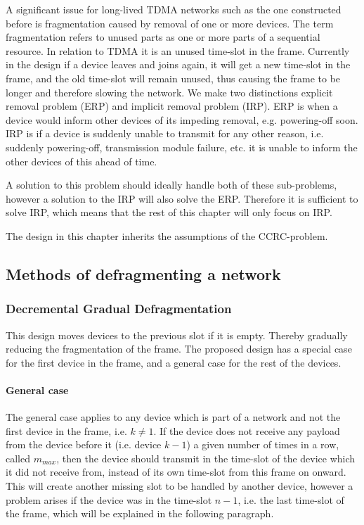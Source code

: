 A significant issue for long-lived TDMA networks such as the one constructed before is fragmentation caused by removal of one or more devices. 
The term fragmentation refers to unused parts as one or more parts of a sequential resource. 
In relation to TDMA it is an unused time-slot in the frame. 
Currently in the design if a device leaves and joins again, it will get a new time-slot in the frame, and the old time-slot will remain unused, thus causing the frame to be longer and therefore slowing the network.
We make two distinctions explicit removal problem (ERP) and implicit removal problem (IRP).
ERP is when a device would inform other devices of its impeding removal, e.g. powering-off soon. 
IRP is if a device is suddenly unable to transmit for any other reason, i.e. suddenly powering-off, transmission module failure, etc. it is unable to inform the other devices of this ahead of time. 

A solution to this problem should ideally handle both of these sub-problems, however a solution to the IRP will also solve the ERP.
Therefore it is sufficient to solve IRP, which means that the rest of this chapter will only focus on IRP.  

The design in this chapter inherits the assumptions of the CCRC-problem. 

\subsection{Methods of defragmenting a network}

\subsubsection{Decremental Gradual Defragmentation}
This design moves devices to the previous slot if it is empty. 
Thereby gradually reducing the fragmentation of the frame.
The proposed design has a special case for the first device in the frame, and a general case for the rest of the devices.

\paragraph{General case}
The general case applies to any device which is part of a network and not the first device in the frame, i.e. $k \neq 1$.
If the device does not receive any payload from the device before it (i.e. device $k - 1$) a given number of times in a row, called $m_{max}$, then the device should transmit in the time-slot of the device which it did not receive from, instead of its own time-slot from this frame on onward. 
This will create another missing slot to be handled by another device, however a problem arises if the device was in the time-slot $n - 1$, i.e. the last time-slot of the frame, which will be explained in the following paragraph.

